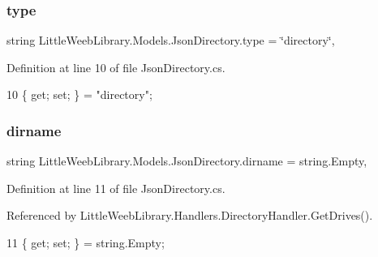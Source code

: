 \subsubsection{\texorpdfstring{type}{type}}
{\footnotesize\ttfamily string Little\+Weeb\+Library.\+Models.\+Json\+Directory.\+type = \char`\"{}directory\char`\"{}\hspace{0.3cm}{\ttfamily [get]}, {\ttfamily [set]}}



Definition at line 10 of file Json\+Directory.\+cs.


\begin{DoxyCode}
10 \{ \textcolor{keyword}{get}; \textcolor{keyword}{set}; \} = \textcolor{stringliteral}{"directory"};
\end{DoxyCode}
\mbox{\label{class_little_weeb_library_1_1_models_1_1_json_directory_a85ca592b7c664bc94b3d1619e6c6beef}} 
\subsubsection{\texorpdfstring{dirname}{dirname}}
{\footnotesize\ttfamily string Little\+Weeb\+Library.\+Models.\+Json\+Directory.\+dirname = string.\+Empty\hspace{0.3cm}{\ttfamily [get]}, {\ttfamily [set]}}



Definition at line 11 of file Json\+Directory.\+cs.



Referenced by Little\+Weeb\+Library.\+Handlers.\+Directory\+Handler.\+Get\+Drives().


\begin{DoxyCode}
11 \{ \textcolor{keyword}{get}; \textcolor{keyword}{set}; \} = \textcolor{keywordtype}{string}.Empty;
\end{DoxyCode}
\mbox{\label{class_little_weeb_library_1_1_models_1_1_json_directory_a7bd33103cb444da0436a3369edcffa19}} 

